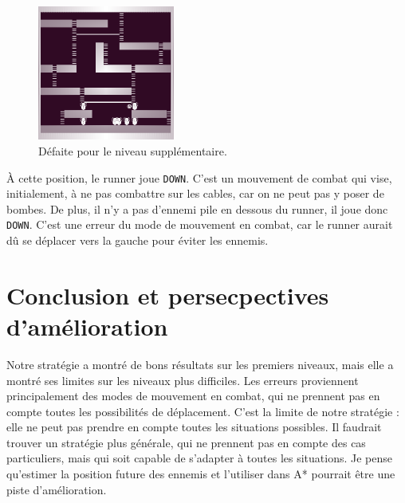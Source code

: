 \begin{figure}[!htpb]
    \centering
    \includegraphics[width=0.4\textwidth]{Figures/level5-over.png}
    \caption{Défaite pour le niveau supplémentaire.}
    \label{fig:defaite-niveau-supplementaire}
\end{figure}

À cette position, le runner joue \texttt{DOWN}.
C'est un mouvement de combat qui vise, initialement, à ne pas combattre sur les cables, car on ne peut pas y poser de bombes.
De plus, il n'y a pas d'ennemi pile en dessous du runner, il joue donc \texttt{DOWN}.
\newline
C'est une erreur du mode de mouvement en combat, car le runner aurait dû se déplacer vers la gauche pour éviter les ennemis.

\section{Conclusion et persecpectives d'amélioration}

Notre stratégie a montré de bons résultats sur les premiers niveaux, mais elle a montré ses limites sur les niveaux plus difficiles.
\newline
Les erreurs proviennent principalement des modes de mouvement en combat, qui ne prennent pas en compte toutes les possibilités de déplacement.
\newline
C'est la limite de notre stratégie : elle ne peut pas prendre en compte toutes les situations possibles.
Il faudrait trouver un stratégie plus générale, qui ne prennent pas en compte des cas particuliers, mais qui soit capable de s'adapter à toutes les situations.
\newline
Je pense qu'estimer la position future des ennemis et l'utiliser dans A* pourrait être une piste d'amélioration.